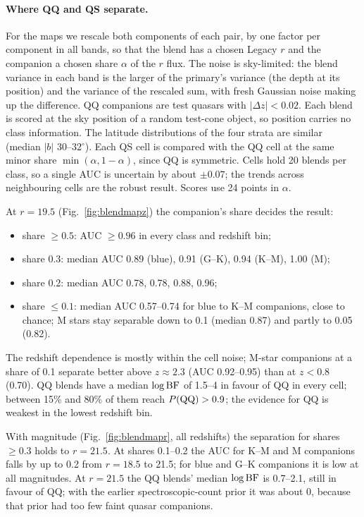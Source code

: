 \documentclass[11pt,a4paper]{article}
\begin{document}
\paragraph{Where QQ and QS separate.} For the maps we rescale both components of each pair, by one factor per
component in all bands, so that the blend has a chosen Legacy $r$ and the companion a chosen share $\alpha$ of
the $r$ flux. The noise is sky-limited: the blend variance in each band is the larger of the primary's
variance (the depth at its position) and the variance of the rescaled sum, with fresh Gaussian noise making
up the difference. QQ companions are test quasars with $|\Delta z|<0.02$. Each blend is scored at the sky
position of a random test-cone object, so position carries no class information. The latitude distributions
of the four strata are similar (median $|b|$ 30--32$^\circ$). Each QS cell is compared with the QQ cell at the
same minor share $\min(\alpha,1-\alpha)$, since QQ is symmetric. Cells hold 20 blends per class, so a single
AUC is uncertain by about $\pm0.07$; the trends across neighbouring cells are the robust result. Scores use
24 points in $\alpha$.

At $r=19.5$ (Fig.~\ref{fig:blendmapz}) the companion's share decides the result:
\begin{itemize}
\item share $\ge0.5$: AUC $\ge0.96$ in every class and redshift bin;
\item share 0.3: median AUC 0.89 (blue), 0.91 (G--K), 0.94 (K--M), 1.00 (M);
\item share 0.2: median AUC 0.78, 0.78, 0.88, 0.96;
\item share $\le0.1$: median AUC 0.57--0.74 for blue to K--M companions, close to chance; M stars stay
  separable down to 0.1 (median 0.87) and partly to 0.05 (0.82).
\end{itemize}
The redshift dependence is mostly within the cell noise; M-star companions at a share of 0.1 separate better
above $z\approx2.3$ (AUC 0.92--0.95) than at $z<0.8$ (0.70).
QQ blends have a median $\log{\rm BF}$ of 1.5--4 in favour of QQ in every cell; between 15\% and 80\% of them
reach $P({\rm QQ})>0.9$; the evidence for QQ is weakest in the lowest redshift bin.

With magnitude (Fig.~\ref{fig:blendmapr}, all redshifts) the separation for shares $\ge0.3$ holds to
$r=21.5$. At shares 0.1--0.2 the AUC for K--M and M companions falls by up to 0.2 from $r=18.5$ to 21.5; for blue and
G--K companions it is low at all magnitudes. At $r=21.5$ the QQ blends' median $\log{\rm BF}$ is 0.7--2.1, still in
favour of QQ; with the earlier spectroscopic-count prior it was about 0, because that prior had too few faint
quasar companions.
\end{document}

